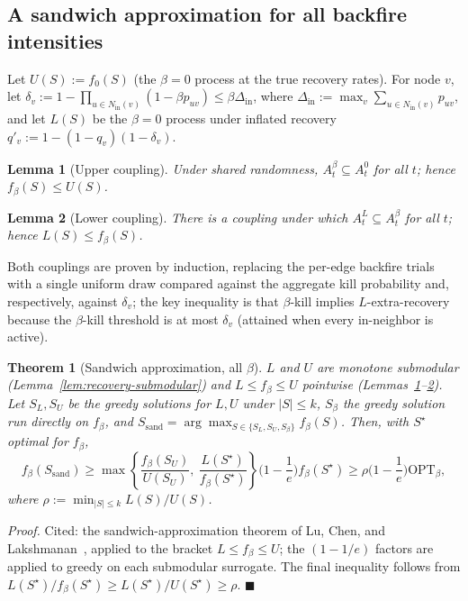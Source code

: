 \documentclass[journal]{IEEEtran}
\newtheorem{theorem}{Theorem}
\newtheorem{lemma}{Lemma}
\newcommand{\eqdef}{:=}
\begin{document}
\subsection{A sandwich approximation for all backfire intensities}

Let $U(S)\eqdef f_0(S)$ (the $\beta=0$ process at the true recovery rates).
For node $v$, let
$\delta_v \eqdef 1-\prod_{u\in N_{\mathrm{in}}(v)}(1-\beta p_{uv}) \le \beta\Delta_{\mathrm{in}}$,
where $\Delta_{\mathrm{in}}\eqdef\max_v\sum_{u\in N_{\mathrm{in}}(v)}p_{uv}$,
and let $L(S)$ be the $\beta=0$ process under inflated recovery
$q'_v\eqdef1-(1-q_v)(1-\delta_v)$.

\begin{lemma}[Upper coupling]
\label{lem:upper}
Under shared randomness, $A^\beta_t\subseteq A^0_t$ for all $t$; hence
$f_\beta(S)\le U(S)$.
\end{lemma}

\begin{lemma}[Lower coupling]
\label{lem:lower}
There is a coupling under which $A^L_t\subseteq A^\beta_t$ for all $t$;
hence $L(S)\le f_\beta(S)$.
\end{lemma}

Both couplings are proven by induction, replacing the per-edge backfire
trials with a single uniform draw compared against the aggregate kill
probability and, respectively, against $\delta_v$; the key inequality is
that $\beta$-kill implies $L$-extra-recovery because the $\beta$-kill
threshold is at most $\delta_v$ (attained when every in-neighbor is
active).

\begin{theorem}[Sandwich approximation, all $\beta$]
\label{thm:sandwich}
$L$ and $U$ are monotone submodular (Lemma~\ref{lem:recovery-submodular})
and $L\le f_\beta\le U$ pointwise (Lemmas~\ref{lem:upper}--\ref{lem:lower}).
Let $S_L, S_U$ be the greedy solutions for $L, U$ under $|S|\le k$, $S_\beta$
the greedy solution run directly on $f_\beta$, and
$S_{\mathrm{sand}}=\arg\max_{S\in\{S_L,S_U,S_\beta\}} f_\beta(S)$. Then, with
$S^\star$ optimal for $f_\beta$,
\begin{equation}
f_\beta(S_{\mathrm{sand}}) \ge \max\left\{\frac{f_\beta(S_U)}{U(S_U)},\ \frac{L(S^\star)}{f_\beta(S^\star)}\right\}\Big(1-\frac1e\Big) f_\beta(S^\star) \ge \rho\Big(1-\frac1e\Big)\mathrm{OPT}_\beta,
\end{equation}
where $\rho \eqdef \min_{|S|\le k} L(S)/U(S)$.
\end{theorem}
\emph{Proof.} Cited: the sandwich-approximation theorem of Lu, Chen, and
Lakshmanan~\cite{lu2015competition}, applied to the bracket $L\le f_\beta\le U$;
the $(1-1/e)$ factors are~\cite{nemhauser1978analysis} applied to greedy on
each submodular surrogate. The final inequality follows from
$L(S^\star)/f_\beta(S^\star)\ge L(S^\star)/U(S^\star)\ge\rho$. $\blacksquare$
\end{document}
